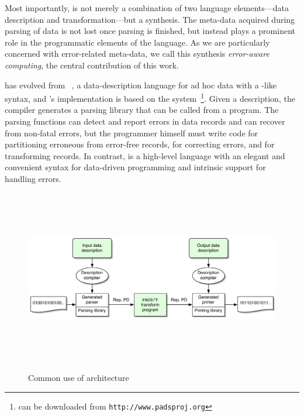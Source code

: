 Most importantly, \datatype{} is not merely a combination of two
language elements---data description and transformation---but a
synthesis.  The meta-data acquired during parsing of data is not lost
once parsing is finished, but instead plays a prominent role in the
programmatic elements of the language.  As we are particularly
concerned with error-related meta-data, we call this synthesis
\emph{error-aware computing}, the central contribution of this work. 

\datatype{} has evolved from \pads{}~\cite{fisher+:pads}, a
data-description language for ad hoc data with a \C{}-like syntax, and
\datatype{}'s implementation is based on the \pads{}
system~\footnote{\pads{} can be downloaded from
\texttt{http://www.padsproj.org}}.  Given a \pads{} description, the
\pads{} compiler generates a parsing library that can be called from a
\C{} program.  The parsing functions can detect and report errors in
data records and can recover from non-fatal errors, but the programmer
himself must write \C{} code for partitioning erroneous from error-free
records, for correcting errors, and for transforming records.  In
contrast, \datatype{} is a high-level language with an elegant and
convenient syntax for data-driven programming and intrinsic support
for handling errors.  


\begin{figure}[tp]
  \includegraphics[height=3in,width=5in]{architecture-grant-pads-t}
\label{fig:pads-arch}
\caption{Common use of \datatype{} architecture}
\end{figure}

